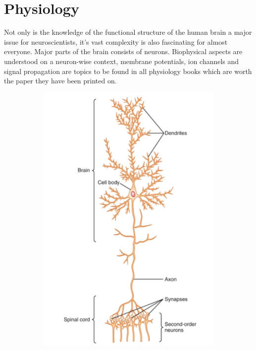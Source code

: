 \documentclass[a4paper]{scrartcl}
\begin{document}
\section{Physiology}
Not only is the knowledge of the functional structure of the human brain a major issue for neuroscientists, it's vast complexity is also fascinating for almost everyone.
Major parts of the brain consists of neurons. 
Biophysical aspects are understood on a neuron-wise context, membrane potentials, ion channels and signal propagation are topics to be found in all physiology books which are worth the paper they have been printed on.\cite[577 et. seq.]{guyton}
\begin{figure}[hbt]
  \begin{subfigure}[l]{0.35\textwidth}
    \includegraphics[width = \textwidth]{pictures/largeNeuron.png}

\end{subfigure}
\end{figure}
\end{document}
